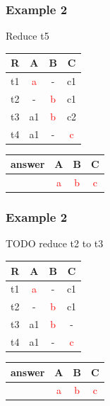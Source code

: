 \documentclass{beamer}
\begin{document}
\begin{frame}
  \frametitle{Example 2}
  Reduce t5
  
  \begin{tabular}{ c | c c c}
  R & A & B & C \\
  \hline
  t1 & \textcolor{red}{a}  & -  & c1 \\
  t2 & -  & \textcolor{red}{b}  & c1 \\
  t3 & a1 & \textcolor{red}{b} & c2 \\
  t4 & a1 & - & \textcolor{red}{c} \\
  \end{tabular}
  \begin{tabular}{ c | c c c}
  answer & A & B & C \\
  \hline
   & \textcolor{red}{a}& \textcolor{red}{b}& \textcolor{red}{c}\\
  \end{tabular}
\end{frame}

\begin{frame}
  \frametitle{Example 2}
  
  TODO reduce t2 to t3
  
  \begin{tabular}{ c | c c c}
  R & A & B & C \\
  \hline
  t1 & \textcolor{red}{a}  & -  & c1 \\
  t2 & -  & \textcolor{red}{b}  & c1 \\
  t3 & a1 & \textcolor{red}{b} & - \\
  t4 & a1 & - & \textcolor{red}{c} \\
  \end{tabular}
  \begin{tabular}{ c | c c c}
  answer & A & B & C \\
  \hline
   & \textcolor{red}{a}& \textcolor{red}{b}& \textcolor{red}{c}\\
  \end{tabular}
\end{frame}
\end{document}
